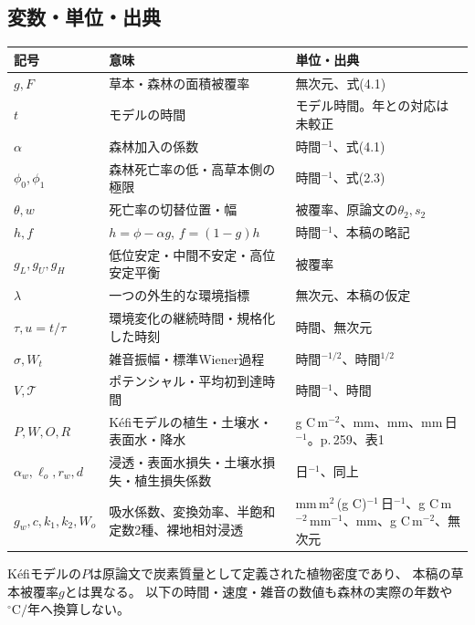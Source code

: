 \documentclass[a4paper,11pt]{ltjsarticle}
\begin{document}
\subsection{変数・単位・出典}
\begin{longtable}{p{27mm}p{74mm}p{42mm}}
\toprule 記号&意味&単位・出典\\\midrule\endhead
$g,F$&草本・森林の面積被覆率&無次元、\cite{kumar}式(4.1)\\
$t$&モデルの時間&モデル時間。年との対応は未較正\\
$\alpha$&森林加入の係数&時間$^{-1}$、\cite{kumar}式(4.1)\\
$\phi_0,\phi_1$&森林死亡率の低・高草本側の極限&時間$^{-1}$、\cite{kumar}式(2.3)\\
$\theta,w$&死亡率の切替位置・幅&被覆率、原論文の$\theta_2,s_2$\\
$h,f$&$h=\phi-\alpha g$, $f=(1-g)h$&時間$^{-1}$、本稿の略記\\
$g_L,g_U,g_H$&低位安定・中間不安定・高位安定平衡&被覆率\\
$\lambda$&一つの外生的な環境指標&無次元、本稿の仮定\\
$\tau,u=t/\tau$&環境変化の継続時間・規格化した時刻&時間、無次元\\
$\sigma,W_t$&雑音振幅・標準Wiener過程&時間$^{-1/2}$、時間$^{1/2}$\\
$V,\mathcal T$&ポテンシャル・平均初到達時間&時間$^{-1}$、時間\\
$P,W,O,R$&Kéfiモデルの植生・土壌水・表面水・降水&
g C\,m$^{-2}$、mm、mm、mm\,日$^{-1}$。\cite{kefi}p.\,259、表1\\
$\alpha_w,\ell_o,r_w,d$&浸透・表面水損失・土壌水損失・植生損失係数&日$^{-1}$、同上\\
$g_w,c,k_1,k_2,W_o$&吸水係数、変換効率、半飽和定数2種、裸地相対浸透&
mm\,m$^2$\,(g C)$^{-1}$\,日$^{-1}$、g C\,m$^{-2}$\,mm$^{-1}$、mm、g C\,m$^{-2}$、無次元\\
\bottomrule
\end{longtable}
Kéfiモデルの$P$は原論文で炭素質量として定義された植物密度であり、
本稿の草本被覆率$g$とは異なる。
以下の時間・速度・雑音の数値も森林の実際の年数や$\mathrm{^\circ C/年}$へ換算しない。
\end{document}
